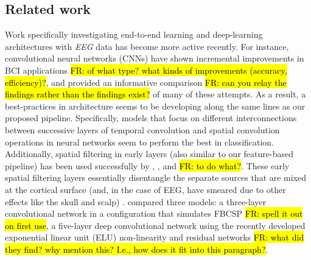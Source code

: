 \documentclass[utf8]{frontiersSCNS} %
\newcommand{\FR}[1]{{\small \textcolor{red}{\hl{FR: #1}}}}
\begin{document}
\subsection{Related work}
Work specifically investigating end-to-end learning and deep-learning architectures with \emph{EEG} data has become more active recently. For instance, convolutional neural networks (CNNs) have shown incremental improvements in BCI applications \FR{of what type? what kinds of improvements (accuracy, efficiency)?}, and \cite{Schirrmeister2017} provided an informative comparison \FR{can you relay the findings rather than the findings exist?} of many of these attempts. As a result, a best-practices in architecture seems to be developing along the same lines as our proposed pipeline. Specifically, models that focus on different interconnections between successive layers of temporal convolution and spatial convolution operations in neural networks seem to perform the best in classification. Additionally, spatial filtering in early layers (also similar to our feature-based pipeline) has been used successfully by \cite{Lawhern2017}, \cite{Sun}, and \cite{Schirrmeister2017} \FR{to do what?}. These early spatial filtering layers essentially disentangle the separate sources that are mixed at the cortical surface (and, in the case of EEG, have smeared due to other effects like the skull and scalp) \cite{ElectricFieldsOfTheBrain_ch5and6}. \cite{Schirrmeister2017} compared three models: a three-layer convolutional network in a configuration that simulates FBCSP \FR{spell it out on first use}, a five-layer deep convolutional network using the recently developed exponential linear unit (ELU) non-linearity \cite{Clevert} and residual networks \cite{He2015a} \FR{what did they find? why mention this? I.e., how does it fit into this paragraph?}.
\end{document}
